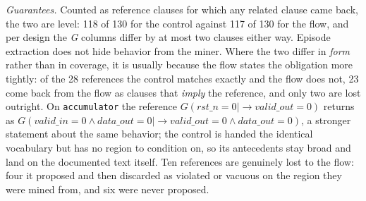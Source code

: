 \emph{Guarantees.} Counted as reference clauses for which any related clause came back, the two
are level: 118 of 130 for the control against 117 of 130 for the flow, and per design the
\emph{G} columns differ by at most two clauses either way. Episode extraction does not hide
behavior from the miner. Where the two differ in \emph{form} rather than in coverage, it is
usually because the flow states the obligation more tightly: of the 28 references the control
matches exactly and the flow does not, 23 come back from the flow as clauses that \emph{imply}
the reference, and only two are lost outright. On \texttt{accumulator} the reference
$G(\mathit{rst\_n}=0 \mid\rightarrow \mathit{valid\_out}=0)$ returns as
$G(\mathit{valid\_in}=0 \wedge \mathit{data\_out}=0 \mid\rightarrow \mathit{valid\_out}=0
\wedge \mathit{data\_out}=0)$, a stronger statement about the same behavior; the control is
handed the identical vocabulary but has no region to condition on, so its antecedents stay
broad and land on the documented text itself. Ten references are genuinely lost to the flow:
four it proposed and then discarded as violated or vacuous on the region they were mined from,
and six were never proposed.

